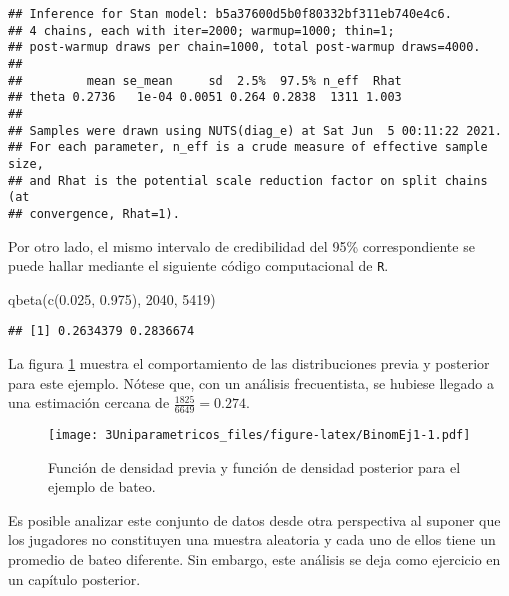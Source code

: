 \documentclass[
  spanish,
]{book}
\newenvironment{Shaded}{\begin{snugshade}}{\end{snugshade}}
\newcommand{\DecValTok}[1]{\textcolor[rgb]{0.00,0.00,0.81}{#1}}
\newcommand{\FloatTok}[1]{\textcolor[rgb]{0.00,0.00,0.81}{#1}}
\newcommand{\FunctionTok}[1]{\textcolor[rgb]{0.00,0.00,0.00}{#1}}
\newcommand{\NormalTok}[1]{#1}
\theoremstyle{definition}
\theoremstyle{definition}
\theoremstyle{definition}
\theoremstyle{definition}
\theoremstyle{remark}
\begin{document}
\begin{verbatim}
## Inference for Stan model: b5a37600d5b0f80332bf311eb740e4c6.
## 4 chains, each with iter=2000; warmup=1000; thin=1; 
## post-warmup draws per chain=1000, total post-warmup draws=4000.
## 
##         mean se_mean     sd  2.5%  97.5% n_eff  Rhat
## theta 0.2736   1e-04 0.0051 0.264 0.2838  1311 1.003
## 
## Samples were drawn using NUTS(diag_e) at Sat Jun  5 00:11:22 2021.
## For each parameter, n_eff is a crude measure of effective sample size,
## and Rhat is the potential scale reduction factor on split chains (at 
## convergence, Rhat=1).
\end{verbatim}

Por otro lado, el mismo intervalo de credibilidad del 95\% correspondiente se puede hallar mediante el siguiente código computacional de \texttt{R}.

\begin{Shaded}
\begin{Highlighting}[]
\FunctionTok{qbeta}\NormalTok{(}\FunctionTok{c}\NormalTok{(}\FloatTok{0.025}\NormalTok{, }\FloatTok{0.975}\NormalTok{), }\DecValTok{2040}\NormalTok{, }\DecValTok{5419}\NormalTok{)}
\end{Highlighting}
\end{Shaded}

\begin{verbatim}
## [1] 0.2634379 0.2836674
\end{verbatim}

La figura \ref{fig:BinomEj1} muestra el comportamiento de las distribuciones previa y posterior para este ejemplo. Nótese que, con un análisis frecuentista, se hubiese llegado a una estimación cercana de \(\frac{1825}{6649}=0.274\).

\begin{figure}
\centering
\texttt{[image: 3Uniparametricos\_files/figure-latex/BinomEj1-1.pdf]}
\caption{\label{fig:BinomEj1}Función de densidad previa y función de densidad posterior para el ejemplo de bateo.}
\end{figure}

Es posible analizar este conjunto de datos desde otra perspectiva al suponer que los jugadores no constituyen una muestra aleatoria y cada uno de ellos tiene un promedio de bateo diferente. Sin embargo, este análisis se deja como ejercicio en un capítulo posterior.
\end{document}
